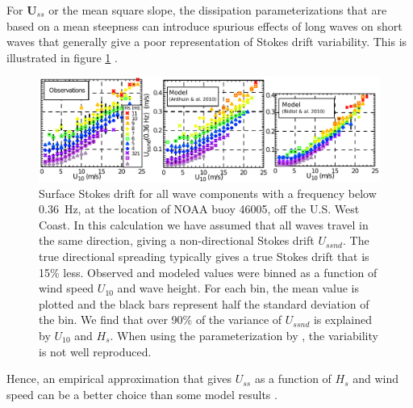 For $ \mathbf{U}_{ss}$ or the mean square slope, the dissipation parameterizations that are based on a 
mean steepness can introduce spurious effects of long waves on short waves that 
generally give a poor representation of Stokes drift variability. This is illustrated in figure \ref{Ussnd} 
\citep[see also figure 8 in][]{Ardhuin&al.2010}. 
\begin{figure}[htb]
\centerline{\includegraphics[width=1.0\textwidth]{FIGS_CH_MODEL/Ussnd_46005.pdf}}
  \caption{Surface Stokes drift for all wave components with a frequency below 0.36~Hz, 
  at the location of NOAA buoy 46005, off the U.S. West Coast.
  In this calculation we have assumed that all waves travel in the same direction, giving 
  a non-directional Stokes drift $U_{ssnd}$. The true directional 
  spreading typically gives a true Stokes drift that is  15\% less. 
  Observed and modeled values were binned as a function of wind speed $U_{10}$ and wave height. For each bin, the 
  mean value is plotted and the black bars represent half the standard deviation of the bin. 
  We find that over 90\% of the variance of 
  $U_{ssnd}$ is explained by $U_{10}$ and $H_s$.
  When using the parameterization by \cite{Bidlot&al.2005}, the variability is not well reproduced. }
  \label{Ussnd}
\end{figure}
Hence, an empirical approximation that gives $U_{ss}$ as a function of $H_s$ and wind speed can be a better 
choice than some model results \citep[see eq. (C3) in][]{Ardhuin&al.2009}.

